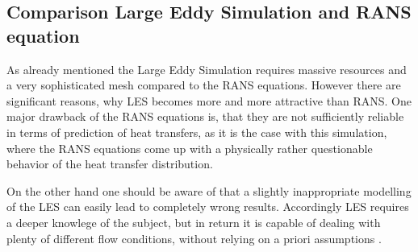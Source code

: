 \subsection{Comparison Large Eddy Simulation and RANS equation}
\label{ss:comparison}
As already mentioned the Large Eddy Simulation requires massive resources and a very sophisticated mesh compared to the RANS equations. However there are significant reasons, why LES becomes more and more attractive than RANS. One major drawback of the RANS equations is, that they are not sufficiently reliable in terms of prediction of heat transfers, as it is the case with this simulation, where the RANS equations come up with a physically rather questionable behavior of the heat transfer distribution.

On the other hand one should be aware of that a slightly inappropriate modelling of the LES can easily lead to completely wrong results. Accordingly LES requires a deeper knowlege of the subject, but in return it is capable of dealing with plenty of different flow conditions, without relying on a priori assumptions \cite{versteeg, frohlich}.

